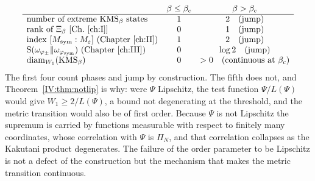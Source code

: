 \begin{remark}\label{IV:rem:orders}
\[
\begin{array}{lcc}
& \beta\le\beta_c & \beta>\beta_c\\\hline
\text{number of extreme }\mathrm{KMS}_\beta\text{ states} & 1 & 2\quad(\text{jump})\\
\text{rank of }\Xi_\beta\ \text{[Ch.~\ref{ch:I}]} & 0 & 1\quad(\text{jump})\\
\text{index }[\Msym:M_\varepsilon]\ \text{(Chapter~\ref{ch:II})} & 1 & 2\quad(\text{jump})\\
\Ent(\omega_{\varphi_\pm}\|\omega_{\phisym})\ \text{(Chapter~\ref{ch:III})} & 0 & \log2\quad(\text{jump})\\
\diam_{W_1}(\mathrm{KMS}_\beta) & 0 & >0\quad(\text{continuous at }\beta_c)
\end{array}
\]
The first four count phases and jump by construction. The fifth does not, and
Theorem~\ref{IV:thm:notlip} is why: were $\Psi$ Lipschitz, the test function $\Psi/L(\Psi)$
would give $W_1\ge2/L(\Psi)$, a bound not degenerating at the threshold, and the metric
transition would also be of first order. Because $\Psi$ is not Lipschitz the supremum is
carried by functions measurable with respect to finitely many coordinates, whose correlation
with $\Psi$ is $\Pi_N$, and that correlation collapses as the Kakutani product degenerates.
The failure of the order parameter to be Lipschitz is not a defect of the construction but
the mechanism that makes the metric transition continuous.
\end{remark}


